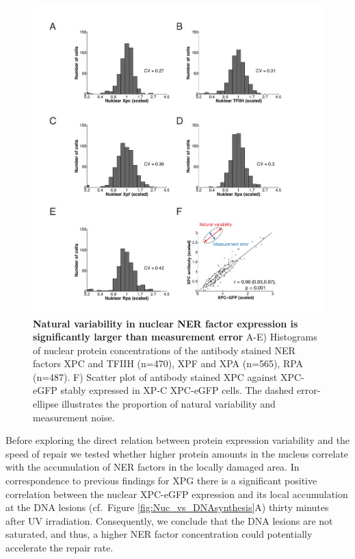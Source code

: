 \begin{figure}[htbp]
	\begin{center}
		\includegraphics[width=1\textwidth]{Abbildungen/figure3_2.pdf}
		\caption{\textbf{Natural variability in nuclear NER factor expression is significantly larger than measurement error} A-E) Histograms of nuclear protein concentrations of the antibody stained NER factors XPC and TFIIH (n=470), XPF and XPA (n=565), RPA (n=487). F) Scatter plot of antibody stained XPC against XPC-eGFP stably expressed in XP-C XPC-eGFP cells. The dashed error-ellipse illustrates the proportion of natural variability and measurement noise.}
		\label{fig:ProteinDist}
	\end{center}
\end{figure}
Before exploring the direct relation between protein expression variability and the speed of repair we tested whether higher protein amounts in the nucleus correlate with the accumulation of NER factors in the locally damaged area. In correspondence to previous findings for XPG \cite{Luijsterburg2010} there is a significant positive correlation between the nuclear XPC-eGFP expression and its local accumulation at the DNA lesions (cf.\ Figure \ref{fig:Nuc_vs_DNAsynthesis}A) thirty minutes after UV irradiation. Consequently, we conclude that the DNA lesions are not saturated, and thus, a higher NER factor concentration could potentially accelerate the repair rate.\\
